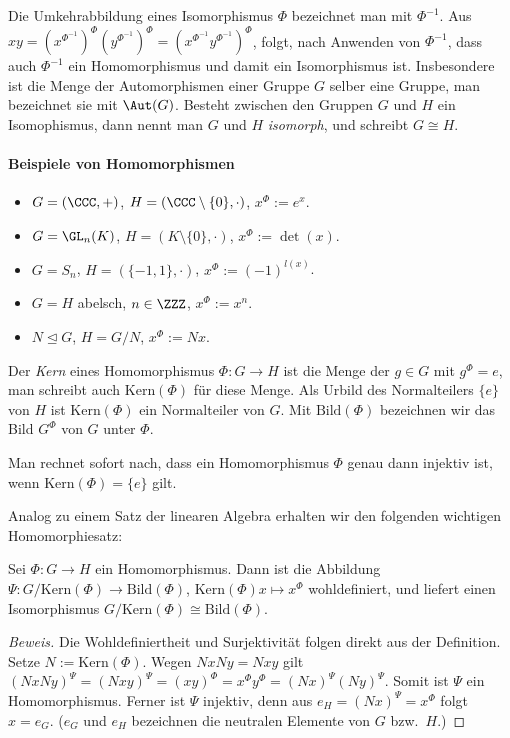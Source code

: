 \documentclass[12pt,a4paper,twoside]{article}
\newcommand{\ei}[1]{\emph{#1}\index{#1}}
\begin{document}
Die Umkehrabbildung eines Isomorphismus $\Phi$ bezeichnet man mit
$\Phi^{-1}$. Aus
$xy=(x^{\Phi^{-1}})^\Phi(y^{\Phi^{-1}})^\Phi=
(x^{\Phi^{-1}}y^{\Phi^{-1}})^\Phi$, folgt, nach Anwenden von $\Phi^{-1}$, dass
auch $\Phi^{-1}$ ein Homomorphismus und damit ein Isomorphismus
ist. Insbesondere ist die Menge der Automorphismen einer Gruppe $G$ selber
eine Gruppe, man bezeichnet sie mit $\Aut(G)$. Besteht zwischen den Gruppen
$G$ und $H$ ein Isomophismus, dann nennt man $G$ und $H$ \ei{isomorph}, und
schreibt $G\cong H$.
\paragraph{Beispiele von Homomorphismen}
\begin{itemize}
\item $G=(\CCC,+)$, $H=(\CCC\setminus\{0\},\cdot)$, $x^\Phi:=e^x$.
\item $G=\GL_n(K)$, $H=(K\setminus\{0\},\cdot)$, $x^\Phi:=\det(x)$.
\item $G=S_n$, $H=(\{-1,1\},\cdot)$, $x^\Phi:=(-1)^{l(x)}$.
\item $G=H$ abelsch, $n\in\ZZZ$, $x^\Phi:=x^n$.
\item $N\trianglelefteq G$, $H=G/N$, $x^\Phi:=Nx$.
\end{itemize}
\begin{Definition}
  Der \ei{Kern} eines Homomorphismus $\Phi:G\to H$ ist die Menge der $g\in G$
  mit $g^\Phi=e$, man schreibt auch $\text{Kern}(\Phi)$ f\"ur diese Menge. Als
  Urbild des Normalteilers $\{e\}$ von $H$ ist $\text{Kern}(\Phi)$ ein
  Normalteiler von $G$. Mit $\text{Bild}(\Phi)$ bezeichnen wir das Bild
  $G^\Phi$ von $G$ unter $\Phi$.
\end{Definition}
\begin{Bemerkung*}
  Man rechnet sofort nach, dass ein Homomorphismus $\Phi$ genau dann injektiv
  ist, wenn $\text{Kern}(\Phi)=\{e\}$ gilt.
\end{Bemerkung*}
Analog zu einem Satz der linearen Algebra erhalten wir den folgenden wichtigen
Homomorphiesatz:
\begin{Satz}
  Sei $\Phi:G\to H$ ein Homomorphismus. Dann ist die Abbildung
  $\Psi:G/\text{Kern}(\Phi)\to\text{Bild}(\Phi)$, $\text{Kern}(\Phi)x\mapsto
  x^\Phi$ wohldefiniert, und liefert einen Isomorphismus
  $G/\text{Kern}(\Phi)\cong\text{Bild}(\Phi)$.
\end{Satz}
\begin{proof}[Beweis]
Die Wohldefiniertheit und Surjektivit\"at folgen direkt aus der
Definition. Setze $N:=\text{Kern}(\Phi)$. Wegen $NxNy=Nxy$ gilt
$(NxNy)^\Psi=(Nxy)^\Psi=(xy)^\Phi=x^\Phi y^\Phi=(Nx)^\Psi(Ny)^\Psi$. Somit ist
$\Psi$ ein Homomorphismus. Ferner ist $\Psi$ injektiv, denn aus
$e_H=(Nx)^\Psi=x^\Phi$ folgt $x=e_G$. ($e_G$ und $e_H$ bezeichnen die
neutralen Elemente von $G$ bzw.\ $H$.)  
\end{proof}
\end{document}
